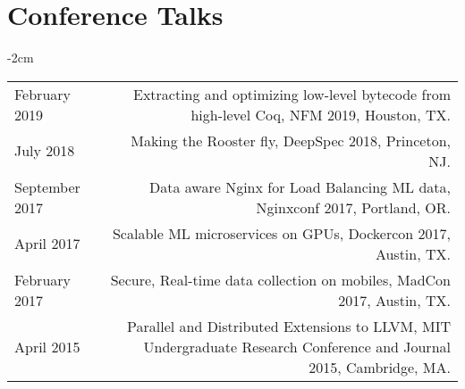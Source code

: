 \documentclass[lettersize,10pt]{article}
\begin{document}
\section{Conference Talks}
\begin{adjustwidth}{}{-2cm}
  \begin{tabularx}{\textwidth}{L R}
    February 2019  & {\sc Extracting and optimizing low-level bytecode from high-level Coq}, NFM 2019, Houston, TX. \\
    July 2018      & {\sc Making the Rooster fly}, DeepSpec 2018, Princeton, NJ. \\
    September 2017 & {\sc Data aware Nginx for Load Balancing ML data}, Nginxconf 2017, Portland, OR. \\
    April 2017     & {\sc Scalable ML microservices on GPUs}, Dockercon 2017, Austin, TX. \\
    February 2017  & {\sc Secure, Real-time data collection on mobiles}, MadCon 2017, Austin, TX. \\
    April 2015     & {\sc Parallel and Distributed Extensions to LLVM}, MIT Undergraduate Research Conference and Journal 2015, Cambridge, MA. \\
  \end{tabularx}
\end{adjustwidth}

\end{document}
